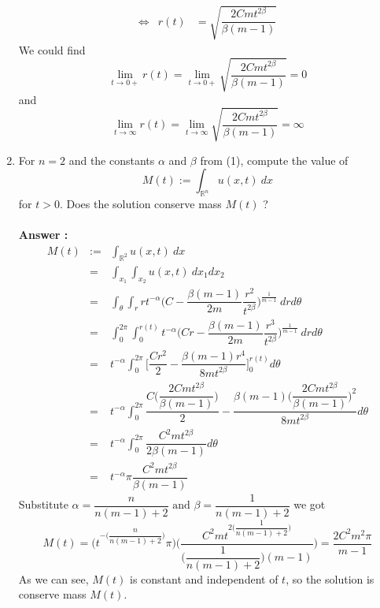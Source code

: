 \documentclass[a4paper,10pt]{article}
\newcommand{\R}{\mathbb{R}}
\begin{document}
\begin{enumerate}
\begin{eqnarray}
	\Leftrightarrow& r(t) &= \sqrt{\dfrac{2Cmt^{2\beta}}{\beta(m-1)}}	
	\end{eqnarray}
	We could find
	\[ \lim\limits_{t\rightarrow 0+}r(t) = \lim\limits_{t\rightarrow 0+}\sqrt{\dfrac{2Cmt^{2\beta}}{\beta(m-1)}} = 0 \]
	and
	\[ \lim\limits_{t\rightarrow \infty}r(t) = \lim\limits_{t\rightarrow \infty}\sqrt{\dfrac{2Cmt^{2\beta}}{\beta(m-1)}} = \infty \]
	\newpage
	\item For $ n=2 $ and the constants $ \alpha $ and $ \beta $ from (1), compute the value of
	\[ M(t) := \int_{\R^n} u(x,t) \ dx \]
	for $ t>0 $. Does the solution conserve mass $ M(t) $ ?\\ \\
	\textbf{Answer :} \\ 
	\begin{eqnarray}\nonumber
	M(t) &:=& \int_{\R^2} u(x,t) \ dx \\ \nonumber
	&=& \int_{x_{1}} \int_{x_{2}} u(x,t) \ dx_{1}dx_{2} \\ \nonumber
	&=& \int_{\theta} \int_{r}  r t^{-\alpha}\big( C-\dfrac{\beta(m-1)}{2m} \dfrac{r^2}{t^{2\beta}} \big)^{\frac{1}{m-1}} \ dr d\theta \\ \nonumber
	&=& \int_{0}^{2\pi} \int_{0}^{r(t)}  t^{-\alpha}\big( Cr-\dfrac{\beta(m-1)}{2m} \dfrac{r^3}{t^{2\beta}} \big)^{\frac{1}{m-1}} \ dr d\theta \\ \nonumber
	&=& t^{-\alpha}  \int_{0}^{2\pi} \Big[ \dfrac{Cr^2}{2} - \dfrac{\beta(m-1)r^4}{8mt^{2\beta}} \Big]_{0}^{r(t)} d\theta \\ \nonumber
	&=& t^{-\alpha}  \int_{0}^{2\pi} \dfrac{C\big(\dfrac{2Cmt^{2\beta}}{\beta(m-1)}\big)}{2} - \dfrac{\beta(m-1)\big(\dfrac{2Cmt^{2\beta}}{\beta(m-1)}\big)^2}{8mt^{2\beta}}  d\theta \\ \nonumber
	&=& t^{-\alpha} \int_{0}^{2\pi} \dfrac{C^2mt^{2\beta}}{2\beta(m-1)} d\theta \\ \nonumber
	&=& t^{-\alpha} \pi \dfrac{C^2mt^{2\beta}}{\beta(m-1)} 
	\end{eqnarray}
	Substitute $ \alpha = \dfrac{n}{n(m-1)+2} \text{ and }  \beta = \dfrac{1}{n(m-1)+2} $ we got
	\[ M(t) = \Big(t^{-\big(\dfrac{n}{n(m-1)+2}\big)} \pi\Big) \Big(\dfrac{C^2mt^{2\big(\dfrac{1}{n(m-1)+2}\big)}}{\big(\dfrac{1}{n(m-1)+2}\big)(m-1)}\Big) = \dfrac{2C^2m^2\pi}{m-1} \]
	As we can see, $ M(t) $ is constant and independent of $ t $, so the solution is conserve mass $ M(t) $.
\end{enumerate}
\end{document}
